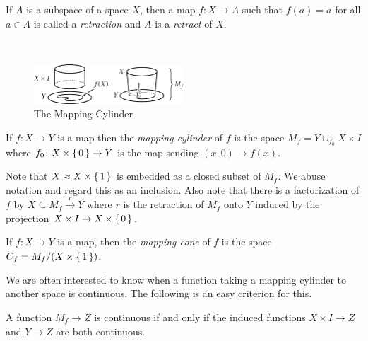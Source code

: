 \documentclass[letterpaper, 11pt, oneside]{book}
\begin{document}
\clearpage

\begin{defn}[Retraction]
  If $A$ is a subspace of a space $X$, then a map $f\colon X \to A$ such that $f(a) = a$ for all $a \in A$ is called a \emph{retraction} and $A$ is a \emph{retract} of $X$.
\end{defn}

\begin{defn}\

  \begin{figure}[h]
    \centering
    \includegraphics[width=0.5\textwidth]{figs/Mapping_Cylinder.png}
    \caption{The Mapping Cylinder~\cite{book:hatcher_AT}}\label{fig:mapping_cylinder}
  \end{figure}

  If $f\colon X \to Y$ is a map then the \emph{mapping cylinder} of $f$ is the space $M_{f} = Y \cup_{f_{0}} X \times I$ where $f_{0}\colon X \times \set{0} \to Y$ is the map sending $(x, 0) \to f(x)$.
\end{defn}

Note that $X \approx X \times \set{1}$ is embedded as a closed subset of $M_{f}$.
We abuse notation and regard this as an inclusion.
Also note that there is a factorization of $f$ by $X \subseteq M_{f} \xrightarrow{r} Y$ where $r$ is the retraction of $M_{f}$ onto $Y$ induced by the projection $X \times I \to X \times \set{0}$.

\begin{defn}
  If $f\colon X \to Y$ is a map, then the \emph{mapping cone} of $f$ is the space $C_{f} = M_{f} / (X \times \set{1})$.
\end{defn}

We are often interested to know when a function taking a mapping cylinder to another space is continuous.
The following is an easy criterion for this.

\begin{prop}\label{prop: mapping_continuity_criterion}
  A function $M_{f} \to Z$ is continuous if and only if the induced functions $X \times I \to Z$ and $Y \to Z$ are both continuous.
\end{prop}
\begin{pf}
\end{pf}
\end{document}

